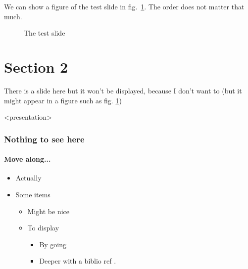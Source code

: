 We can show a figure of the test slide in
fig.~\ref{fig:test-slide}. The order does not matter that much.

\begin{figure}
  \centering
  \caption{The test slide}
  \label{fig:test-slide}
\end{figure}

\section{Section 2}
\label{sec:section-2}

There is a slide here but it won't be displayed, because I don't want
to (but it might appear in a figure such as fig. \ref{fig:test-slide})

\begin{frame}<presentation>
  \frametitle{Nothing to see here}
  \framesubtitle{Move along...}

  \begin{itemize}
  \item Actually
  \item Some items
    \begin{itemize}
    \item Might be nice
    \item To display
      \begin{itemize}
      \item By going
      \item Deeper with a biblio ref \cite{test04}.
      \end{itemize}
    \end{itemize}
  \end{itemize}
\end{frame}






